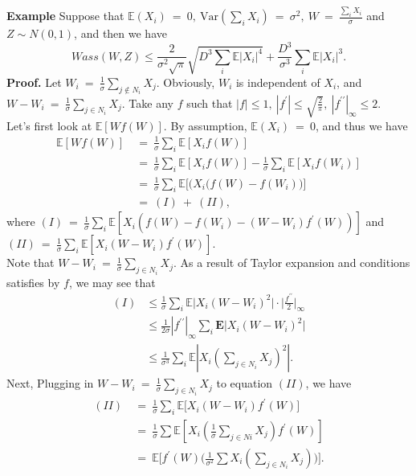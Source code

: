 \documentclass[12pt]{article}
\newcommand{\eq }{\: = \:}
\theoremstyle{nonumberplain}
\begin{document}
\noindent
\textbf{Example}
Suppose that $\mathbb{E}(X_{i})\eq 0,\ \mathrm{Var}(\sum_{i}X_{i})\eq \sigma ^{2},\ W\eq \frac{\sum_{i}X_{i}}{\sigma}$ and $Z\sim N(0,1)$, and then we have
$$
Wass(W,Z)\leq \frac{2}{\sigma ^{2} \sqrt{\pi}} \sqrt{D^{3}\sum_{i} \mathbb{E}|X_{i}|^{4}} + \frac{D^{3}}{\sigma^{3}} \sum_{i} \mathbb{E}|X_{i}|^{3}.
$$
\textbf{Proof.} Let $W_{i}\eq \frac{1}{\sigma} \sum_{j\notin N_{i}} X_{j}$. Obviously, $W_{i}$ is independent of $X_{i}$, and $W-W_{i}\eq \frac{1}{\sigma} \sum_{j\in N_{i}} X_{j}$. Take any $f$ such that $|f|\leq 1, \ |f^{\prime}|\leq \sqrt{\frac{2}{\pi}},\ |f^{\prime \prime}|_{\infty}\leq 2$. \\
Let's first look at $\mathbb{E}[Wf(W)]$. By assumption, $\mathbb{E}(X_{i})\eq 0$, and thus we have
\begin{align*}
\mathbb{E}[Wf(W)]&\eq \frac{1}{\sigma} \sum_{i} \mathbb{E}[X_{i}f(W)]\\
&\eq \frac{1}{\sigma} \sum_{i} \mathbb{E}[X_{i}f(W)]-\frac{1}{\sigma} \sum_{i} \mathbb{E}[X_{i}f(W_{i})]\\
&\eq \frac{1}{\sigma} \sum_{i} \mathbb{E}\bigl[\bigl(X_{i}(f(W)-f(W_{i})\bigr)\bigr]\\
&\eq (I)\ +\ (II),
\end{align*}
where $(I)\eq \frac{1}{\sigma} \sum_{i} \mathbb{E}[X_{i}(f(W)-f(W_{i})-(W-W_{i})f^{\prime}(W))]$ and $(II)\eq \frac{1}{\sigma} \sum_{i} \mathbb{E}[X_{i}(W-W_{i})f^{\prime}(W)]$.\\
Note that $W-W_{i}\eq \frac{1}{\sigma} \sum_{j\in N_{i}}X_{j}$. As a result of Taylor expansion and conditions satisfies by $f$, we may see that
\begin{align*}
(I)&\leq \frac{1}{\sigma}\sum_{i} \mathbb{E}\bigr|X_{i}(W-W_{i})^{2} \bigr| \cdot \biggr| \frac{f^{\prime \prime}}{2}  \biggr|_{\infty}\\
&\leq \frac{1}{2\sigma}|f^{\prime \prime}|_{\infty} \sum_{i} \mathbf{E}\bigl|X_{i}(W-W_{i})^{2} \bigr|\\
&\leq \frac{1}{\sigma ^{3}} \sum_{i} \mathbb{E}|X_{i}(\sum_{j\in N_{i}} X_j)^{2}|.
\end{align*}
Next, Plugging in $W-W_{i}\eq \frac{1}{\sigma} \sum_{j\in N_{i}} X_{j}$ to equation $(II)$, we have
\begin{align*}
(II)&\eq \frac{1}{\sigma} \sum_{i} \mathbb{E}\bigl[X_{i}(W-W_{i})f^{\prime}(W)\bigr]\\
&\eq \frac{1}{\sigma} \sum \mathbb{E}[X_{i}(\frac{1}{\sigma} \sum_{j\in N{i}}X_{j})f^{\prime}(W)]\\
&\eq \mathbb{E}\bigl[f^{\prime}(W) \bigl(\frac{1}{\sigma ^{2}} \sum X_{i} (\sum_{j\in N_{i}}X_{j})\bigr)\bigr].
\end{align*}
\end{document}
